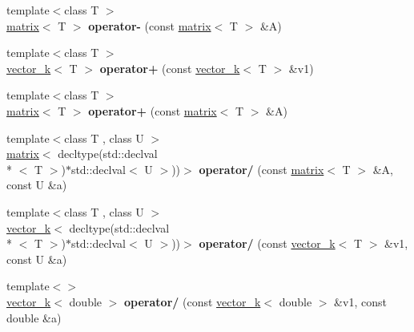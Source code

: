 \begin{DoxyCompactItemize}
\item 
\hypertarget{namespacekeycpp_a390125160a7febd08d5c30629f4f698f}{{\footnotesize template$<$class T $>$ }\\\hyperlink{classkeycpp_1_1matrix}{matrix}$<$ T $>$ {\bfseries operator-\/} (const \hyperlink{classkeycpp_1_1matrix}{matrix}$<$ T $>$ \&A)}\label{namespacekeycpp_a390125160a7febd08d5c30629f4f698f}

\item 
\hypertarget{namespacekeycpp_a5daa1c95786fd3745687914963e7229e}{{\footnotesize template$<$class T $>$ }\\\hyperlink{classkeycpp_1_1vector__k}{vector\-\_\-k}$<$ T $>$ {\bfseries operator+} (const \hyperlink{classkeycpp_1_1vector__k}{vector\-\_\-k}$<$ T $>$ \&v1)}\label{namespacekeycpp_a5daa1c95786fd3745687914963e7229e}

\item 
\hypertarget{namespacekeycpp_a5b10f703c72875b9f5e2ecc5c7696f9c}{{\footnotesize template$<$class T $>$ }\\\hyperlink{classkeycpp_1_1matrix}{matrix}$<$ T $>$ {\bfseries operator+} (const \hyperlink{classkeycpp_1_1matrix}{matrix}$<$ T $>$ \&A)}\label{namespacekeycpp_a5b10f703c72875b9f5e2ecc5c7696f9c}

\item 
\hypertarget{namespacekeycpp_a3852c35cfcc8caa784465a26d04c68a1}{{\footnotesize template$<$class T , class U $>$ }\\\hyperlink{classkeycpp_1_1matrix}{matrix}$<$ decltype(std\-::declval\\*
$<$ T $>$)$\ast$std\-::declval$<$ U $>$))$>$ {\bfseries operator/} (const \hyperlink{classkeycpp_1_1matrix}{matrix}$<$ T $>$ \&A, const U \&a)}\label{namespacekeycpp_a3852c35cfcc8caa784465a26d04c68a1}

\item 
\hypertarget{namespacekeycpp_afce3d5f6cf95bb68e12f3f80ff146ed8}{{\footnotesize template$<$class T , class U $>$ }\\\hyperlink{classkeycpp_1_1vector__k}{vector\-\_\-k}$<$ decltype(std\-::declval\\*
$<$ T $>$)$\ast$std\-::declval$<$ U $>$))$>$ {\bfseries operator/} (const \hyperlink{classkeycpp_1_1vector__k}{vector\-\_\-k}$<$ T $>$ \&v1, const U \&a)}\label{namespacekeycpp_afce3d5f6cf95bb68e12f3f80ff146ed8}

\item 
\hypertarget{namespacekeycpp_acf439f423c568a970ddc8cde5940a0e8}{{\footnotesize template$<$$>$ }\\\hyperlink{classkeycpp_1_1vector__k}{vector\-\_\-k}$<$ double $>$ {\bfseries operator/} (const \hyperlink{classkeycpp_1_1vector__k}{vector\-\_\-k}$<$ double $>$ \&v1, const double \&a)}\label{namespacekeycpp_acf439f423c568a970ddc8cde5940a0e8}


\end{DoxyCompactItemize}
